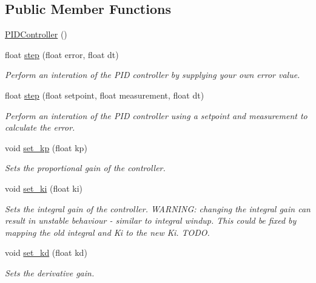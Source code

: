 \subsection*{Public Member Functions}
\begin{DoxyCompactItemize}
\item 
\hyperlink{classetk_1_1_p_i_d_controller_ae0b3ccadf13c06f32429a769ef816351}{P\-I\-D\-Controller} ()
\item 
float \hyperlink{classetk_1_1_p_i_d_controller_abb92773f41ad5b1650653417f91e0528}{step} (float error, float dt)
\begin{DoxyCompactList}\small\item\em Perform an interation of the P\-I\-D controller by supplying your own error value. \end{DoxyCompactList}\item 
float \hyperlink{classetk_1_1_p_i_d_controller_a9877d3e02bc8935b568f778e683b8633}{step} (float setpoint, float measurement, float dt)
\begin{DoxyCompactList}\small\item\em Perform an interation of the P\-I\-D controller using a setpoint and measurement to calculate the error. \end{DoxyCompactList}\item 
void \hyperlink{classetk_1_1_p_i_d_controller_a9a38573051513d5615fc3c553e307c3f}{set\-\_\-kp} (float kp)
\begin{DoxyCompactList}\small\item\em Sets the proportional gain of the controller. \end{DoxyCompactList}\item 
void \hyperlink{classetk_1_1_p_i_d_controller_a3a76b07f655128e9a45dce2297c6ad8c}{set\-\_\-ki} (float ki)
\begin{DoxyCompactList}\small\item\em Sets the integral gain of the controller. W\-A\-R\-N\-I\-N\-G\-: changing the integral gain can result in unstable behaviour -\/ similar to integral windup. This could be fixed by mapping the old integral and Ki to the new Ki. T\-O\-D\-O. \end{DoxyCompactList}\item 
void \hyperlink{classetk_1_1_p_i_d_controller_a69337b2053e22fe3de8ecdcc93169579}{set\-\_\-kd} (float kd)
\begin{DoxyCompactList}\small\item\em Sets the derivative gain. \end{DoxyCompactList}\item 

\end{DoxyCompactItemize}
